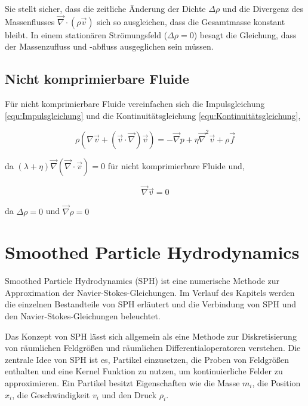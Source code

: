 \documentclass[a4paper, 12pt]{article}
\begin{document}
Sie stellt sicher, dass die zeitliche Änderung der Dichte \(\Delta \rho\) und die Divergenz des Massenflusses \(\vec{\nabla} \cdot (\rho \vec{v})\) sich so ausgleichen, dass die Gesamtmasse konstant bleibt. In einem stationären Strömungsfeld (\(\Delta \rho = 0\)) besagt die Gleichung, dass der Massenzufluss und -abfluss ausgeglichen sein müssen.

\subsection{Nicht komprimierbare Fluide}
Für nicht komprimierbare Fluide vereinfachen sich die Impulsgleichung \eqref{equ:Impulsgleichung} und die Kontinuitätsgleichung \eqref{equ:Kontinuitätsgleichung},

\begin{equation} \label{equ:einfachImpulsgleichung}
	\rho(\nabla \vec{v} + (\vec{v} \cdot \vec{\nabla})\vec{v}) = - \vec{\nabla}p + \eta \vec{\nabla}^2 \vec{v} + \rho \vec{f}
\end{equation}

da \((\lambda + \eta)\vec{\nabla}(\vec{\nabla} \cdot \vec{v}) = 0\) für nicht komprimierbare Fluide und,

\begin{equation} \label{equ:einfachKontinuitätsgleichung}
	\vec{\nabla} \vec{v} = 0
\end{equation}

da \(\Delta \rho = 0\) und \(\vec{\nabla}\rho = 0\)

\section{Smoothed Particle Hydrodynamics} \label{Kap:SPH}
Smoothed Particle Hydrodynamics (SPH) ist eine numerische Methode zur Approximation der Navier-Stokes-Gleichungen. Im Verlauf des Kapitels werden die einzelnen Bestandteile von SPH erläutert und die Verbindung von SPH und den Navier-Stokes-Gleichungen beleuchtet.

Das Konzept von SPH lässt sich allgemein als eine Methode zur Diskretisierung von räumlichen Feldgrößen und räumlichen Differentialoperatoren verstehen. Die zentrale Idee von SPH ist es, Partikel einzusetzen, die Proben von Feldgrößen enthalten und eine Kernel Funktion zu nutzen, um kontinuierliche Felder zu approximieren. Ein Partikel besitzt Eigenschaften wie die Masse \( m_i \), die Position \( x_i \), die Geschwindigkeit \( v_i \) und den Druck \( \rho_i \).
\end{document}
